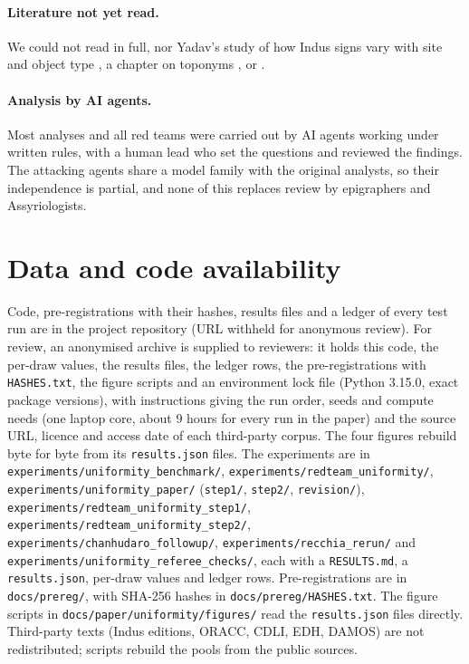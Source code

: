 \documentclass[11pt,a4paper]{article}
\begin{document}
\paragraph{Literature not yet read.} We could not read \citet{recchia2016} in full, nor Yadav's study of how Indus signs vary with site and object type \citep{yadav2013}, a chapter on toponyms \citep{mahadevan2018}, or \citet{wells2011}. %

\paragraph{Analysis by AI agents.} Most analyses and all red teams were carried out by AI agents working under written rules, with a human lead who set the questions and reviewed the findings.
The attacking agents share a model family with the original analysts, so their independence is partial, and none of this replaces review by epigraphers and Assyriologists.

\section*{Data and code availability}
\label{sec:availability}

Code, pre-registrations with their hashes, results files and a ledger of every test run are in the project repository (URL withheld for anonymous review).
For review, an anonymised archive is supplied to reviewers: it holds this code, the per-draw values, the results files, the ledger rows, the pre-registrations with \nolinkurl{HASHES.txt}, the figure scripts and an environment lock file (Python 3.15.0, exact package versions), with instructions giving the run order, seeds and compute needs (one laptop core, about 9 hours for every run in the paper) and the source URL, licence and access date of each third-party corpus. The four figures rebuild byte for byte from its \nolinkurl{results.json} files.
The experiments are in \nolinkurl{experiments/uniformity_benchmark/}, \nolinkurl{experiments/redteam_uniformity/}, \nolinkurl{experiments/uniformity_paper/} (\nolinkurl{step1/}, \nolinkurl{step2/}, \nolinkurl{revision/}), \nolinkurl{experiments/redteam_uniformity_step1/}, \nolinkurl{experiments/redteam_uniformity_step2/}, \nolinkurl{experiments/chanhudaro_followup/}, \nolinkurl{experiments/recchia_rerun/} and \nolinkurl{experiments/uniformity_referee_checks/}, each with a \nolinkurl{RESULTS.md}, a \nolinkurl{results.json}, per-draw values and ledger rows.
Pre-registrations are in \nolinkurl{docs/prereg/}, with SHA-256 hashes in \nolinkurl{docs/prereg/HASHES.txt}.
The figure scripts in \nolinkurl{docs/paper/uniformity/figures/} read the \nolinkurl{results.json} files directly.
Third-party texts (Indus editions, ORACC, CDLI, EDH, DAMOS) are not redistributed; scripts rebuild the pools from the public sources.
\end{document}
